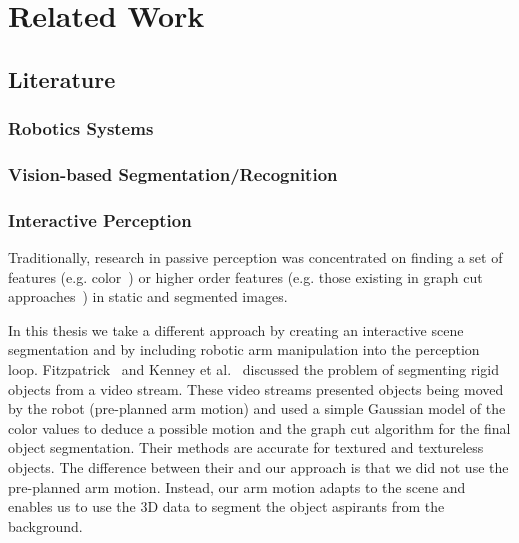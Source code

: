 \chapter{Related Work}
\label{chapter:Related Work}


\section{Literature}
\subsection{Robotics Systems}
\subsection{Vision-based Segmentation/Recognition}
\subsection{Interactive Perception}

Traditionally, research in passive perception was concentrated on finding a set of features (e.g. color~\cite{Balch_2000_3584}) or higher order features (e.g. those existing in graph cut approaches~\cite{BoykovGraphCut}) in static and segmented images.

In this thesis we take a different approach by creating an interactive scene segmentation and by including robotic arm manipulation into the perception loop. Fitzpatrick~\cite{fitzpatrick_active_vision} and Kenney et al.~\cite{KenneyInteractive} discussed the problem of segmenting rigid objects from a video stream. These video streams presented objects being moved by the robot (pre-planned arm motion) and used a simple Gaussian model of the color values to deduce a possible motion and the graph cut algorithm for the final object segmentation. Their methods are accurate for textured and textureless objects. The difference between their and our approach is that we did not use the pre-planned arm motion. Instead, our arm motion adapts to the scene and enables us to use the 3D data to segment the object aspirants from the background.

